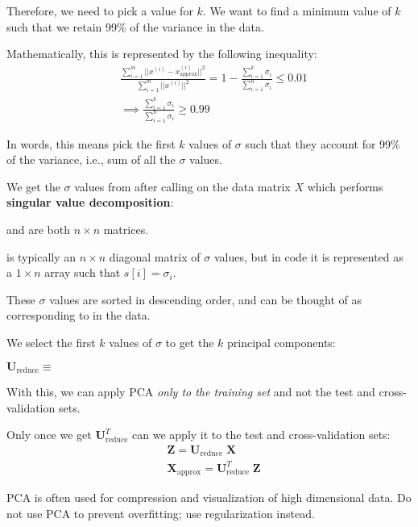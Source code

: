 Therefore, we need to pick a value for $k$. We want to find a minimum value of $k$ such that
we retain 99\% of the variance in the data.

Mathematically, this is represented by the following inequality:
\begin{align*}
    & \frac{\sum_{i=1}^{m} || x^{(i)} - x^{(i)}_{\text{approx}} ||^2}{\sum_{i=1}^{m} || x^{(i)} ||^2}
    = 1 - \frac{\sum_{i=1}^{k} \sigma_i}{\sum_{i=1}^{n} \sigma_i}
    \leq 0.01 \\[0.5em]
    & \implies \frac{\sum_{i=1}^{k} \sigma_i}{\sum_{i=1}^{n} \sigma_i}
    \geq 0.99
\end{align*}

In words, this means pick the first $k$ values of $\sigma$ such that they account for 
99\% of the variance, i.e., sum of all the $\sigma$ values.

We get the $\sigma$ values from  after calling  on the data matrix $X$
which performs \textbf{singular value decomposition}:


 and  are both $n \times n$ matrices.

 is typically an $n \times n$ diagonal matrix of $\sigma$ values, but in
code it is represented as a $1 \times n$ array such that $s[i] = \sigma_i$.

These $\sigma$ values are sorted in descending order, and can be thought of as corresponding
to  in the data.

We select the first $k$ values of $\sigma$ to get the $k$ principal components:

$\mathbf{U}_{\text{reduce}} \equiv$ 

With this, we can apply PCA \emph{only to the training set} and not the test and cross-validation sets.

Only once we get $\mathbf{U}_\text{reduce}^T$ can we apply it to the test and cross-validation sets:
\begin{align*}
    & \mathbf{Z} = \mathbf{U}_\text{reduce} \; \mathbf{X} \\
    & \mathbf{X}_{\text{approx}} = \mathbf{U}_\text{reduce}^T \; \mathbf{Z}
\end{align*}

PCA is often used for compression and visualization of high dimensional data.
Do not use PCA to prevent overfitting; use regularization instead.